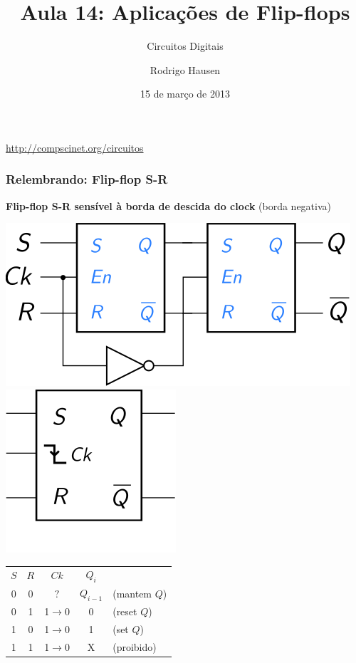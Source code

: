 \documentclass{beamer}
\title{Aula 14: Aplicações de Flip-flops}
\subtitle{Circuitos Digitais}
\author{Rodrigo Hausen}
\institute{CMCC -- UFABC}
\date{15 de março de 2013}
\begin{document}
\begin{frame}
\maketitle

\vspace{-1cm}

\begin{center}
\url{http://compscinet.org/circuitos}
\end{center}

\end{frame}

\begin{frame}
\frametitle{Relembrando: Flip-flop S-R}

\textbf{Flip-flop S-R sensível à borda de descida do clock} (borda negativa)

\begin{center}
\includegraphics{images/flipflopRS_circuit}
\hspace{2ex}
\raisebox{50pt}{\Huge$=$}
\hspace{2ex}
\includegraphics{images/flipflopRS_blackbox}

\vspace{12pt}

\begin{tabular}{ccc||cl}
$S$ & $R$ &        $Ck$       & $Q_i$ \\
\cline{1-4}
 0  &  0  &        $?$        & $Q_{i-1}$  & (mantem $Q$) \\
 0  &  1  &  1$\rightarrow$0  &     0      & (reset $Q$) \\
 1  &  0  &  1$\rightarrow$0  &     1      & (set $Q$) \\
 1  &  1  &  1$\rightarrow$0  &     X  & (proibido) \\
\end{tabular}
\end{center}

\end{frame}
\end{document}
